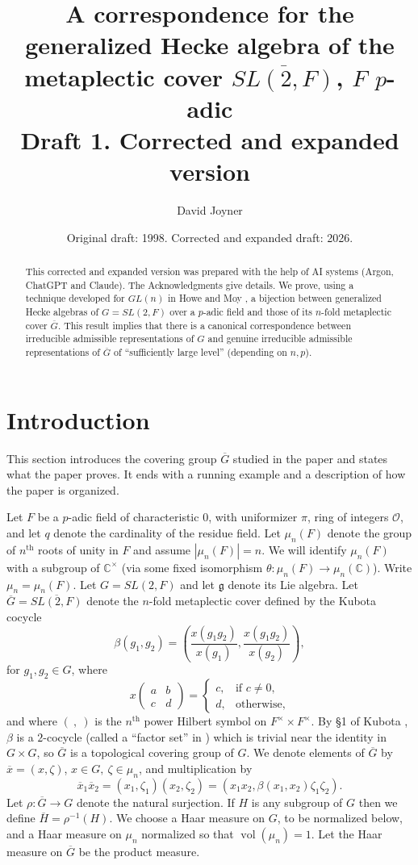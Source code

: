 \documentclass[12pt,letterpaper,reqno]{amsart}
\title[The generalized Hecke algebra of $\overline{SL(2,F)}$]{A correspondence
for the generalized Hecke algebra of the metaplectic cover
$\overline{SL(2,F)}$, $F$ $p$-adic\\[1ex]
{\normalsize Draft 1. Corrected and expanded version}}
\author{David Joyner}
\date{Original draft: 1998. Corrected and expanded draft: 2026.}
\let\cal\mathcal
\let\Bbb\mathbb
\let\frak\mathfrak
\theoremstyle{definition}
\theoremstyle{remark}
\numberwithin{equation}{section}
\newcommand{\abstracttext}{This corrected and expanded version was prepared
with the help of AI systems (Argon, ChatGPT and Claude). The Acknowledgments
give details. We prove, using a technique developed for
$GL(n)$ in Howe and Moy \cite{HM85}, a bijection between generalized Hecke
algebras of $G=SL(2,F)$ over a $p$-adic field and those of its $n$-fold
metaplectic cover $\overline{G}$. This result implies that there is a
canonical correspondence between irreducible admissible representations of $G$
and genuine irreducible admissible representations of $\overline{G}$ of
``sufficiently large level'' (depending on $n,p$).}
\begin{document}
\begin{abstract}
\abstracttext
\end{abstract}

\maketitle

\tableofcontents


\section{Introduction}
\label{sec:intro}

This section introduces the covering group $\overline{G}$ studied in the
paper and states what the paper proves. It ends with a running example and a
description of how the paper is organized.

Let $F$ be a $p$-adic field of characteristic $0$, with uniformizer $\pi$,
ring of integers ${\cal O}$, and let $q$ denote the cardinality of the residue
field. Let $\mu_n(F)$ denote the group of $n^{\text{th}}$ roots of unity in $F$
and assume $|\mu_n(F)|=n$. We will identify $\mu_n(F)$ with a subgroup of
${\Bbb{C}}^\times$ (via some fixed isomorphism
$\theta:\mu_n(F)\rightarrow \mu_n({\Bbb{C}})$). Write $\mu_n=\mu_n(F)$.
Let $G=SL(2,F)$ and let $\frak{g}$ denote its Lie algebra. Let
$\overline{G}=\overline{SL(2,F)}$ denote the $n$-fold metaplectic cover
defined by the Kubota cocycle
\[
\beta(g_1,g_2)=\left(\frac{x(g_1g_2)}{x(g_1)},
\frac{x(g_1g_2)}{x(g_2)}\right),
\]
for $g_1,g_2\in G$, where
\[
x\begin{pmatrix}
a & b\\
c & d
\end{pmatrix}=
\begin{cases}
c, & \text{if } c\neq 0,\\
d, & \text{otherwise},
\end{cases}
\]
and where $(\ ,\ )$ is the $n^{\text{th}}$ power Hilbert symbol on
$F^\times \times F^\times$. By \S 1 of Kubota \cite{Ku67}, $\beta$ is a
$2$-cocycle (called a ``factor set'' in \cite{Ku67}) which is trivial near the
identity in $G\times G$, so $\overline{G}$ is a topological covering group of
$G$. We denote elements of $\overline{G}$ by $\overline{x}=(x,\zeta)$,
$x\in G,\ \zeta\in \mu_n$, and multiplication by
\[
\overline{x}_1\overline{x}_2=(x_1,\zeta_1)(x_2,\zeta_2)
=(x_1x_2,\beta(x_1,x_2)\zeta_1\zeta_2).
\]
Let $\rho:\overline{G}\rightarrow G$ denote the natural surjection. If $H$ is
any subgroup of $G$ then we define $\overline{H}=\rho^{-1}(H)$. We choose a
Haar measure on $G$, to be normalized below, and a Haar measure on $\mu_n$
normalized so that $\operatorname{vol}(\mu_n)=1$. Let the Haar measure on
$\overline{G}$ be the product measure.
\end{document}
